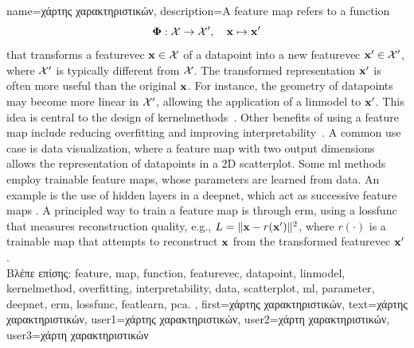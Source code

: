{name={\foreignlanguage{greek}{χάρτης χαρακτηριστικών}}, 
	description={A \gls{feature} \gls{map} refers to a \gls{function} 
		$$
		{\bf \Phi}: \mathcal{X} \rightarrow \mathcal{X}', \quad {\bf x} \mapsto {\bf x}'
		$$
		that transforms a \gls{featurevec} ${\bf x} \in \mathcal{X}$ of 
 		a \gls{datapoint} into a new \gls{featurevec} ${\bf x}' \in \mathcal{X}'$, 
 		where $\mathcal{X}'$ is typically different from $\mathcal{X}$.
 		The transformed representation ${\bf x}'$ is often more useful than the original 
 		${\bf x}$. For instance, the geometry of \gls{datapoint}s may become more linear 
 		in $\mathcal{X}'$, allowing the application of a \gls{linmodel} to ${\bf x}'$. 
 		This idea is central to the design of \gls{kernelmethod}s~\cite{LearningKernelsBook}.
 		Other benefits of using a \gls{feature} \gls{map} include reducing \gls{overfitting} and 
 		improving \gls{interpretability}~\cite{Ribeiro2016}. A common use case is \gls{data} 
 		visualization, where a \gls{feature} \gls{map} with two output dimensions allows the representation 
 		of \gls{datapoint}s in a 2D \gls{scatterplot}. Some \gls{ml} methods employ trainable 
 		\gls{feature} \gls{map}s, whose \gls{parameter}s are learned from \gls{data}. An example is 
 		the use of hidden layers in a \gls{deepnet}, which act as successive \gls{feature} \glspl{map} 
 		\cite{MallatUnderstandingDeepLearning}. A principled way to train a \gls{feature} \gls{map}  
 		is through \gls{erm}, using a \gls{lossfunc} that measures reconstruction quality, 
 		e.g., $L = \|{\bf x} - r({\bf x}')\|^2$, where $r(\cdot)$ is a trainable
 		\gls{map} that attempts to reconstruct ${\bf x}$ from the transformed \gls{featurevec} ${\bf x}'$. \\
		\foreignlanguage{greek}{Βλέπε επίσης:} \gls{feature}, \gls{map}, \gls{function}, \gls{featurevec}, \gls{datapoint}, \gls{linmodel}, 
		\gls{kernelmethod}, \gls{overfitting}, \gls{interpretability}, \gls{data}, \gls{scatterplot}, \gls{ml}, \gls{parameter}, \gls{deepnet}, 
		\gls{erm}, \gls{lossfunc}, \gls{featlearn}, \gls{pca}. },
	first={\foreignlanguage{greek}{χάρτης χαρακτηριστικών}},
	text={\foreignlanguage{greek}{χάρτης χαρακτηριστικών}},
	user1={\foreignlanguage{greek}{χάρτης χαρακτηριστικών}}, %
  	user2={\foreignlanguage{greek}{χάρτη χαρακτηριστικών}}, %
	user3={\foreignlanguage{greek}{χάρτη χαρακτηριστικών}} %
}

